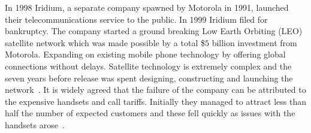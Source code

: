 {}

In 1998 Iridium, a separate company spawned by Motorola in 1991, launched their telecommunications service to the public.
In 1999 Iridium filed for bankruptcy.
The company started a ground breaking Low Earth Orbiting (LEO) satellite network which was made possible by a total \$$5$ billion investment from Motorola.
Expanding on existing mobile phone technology by offering global connections without delays.
Satellite technology is extremely complex and the seven years before release was spent designing, constructing and launching the network~\cite{fink2000iridium}. 
It is widely agreed that the failure of the company can be attributed to the expensive handsets and call tariffs.
Initially they managed to attract less than half the number of expected customers and these fell quickly as issues with the handsets arose~\cite{bill1999}.
